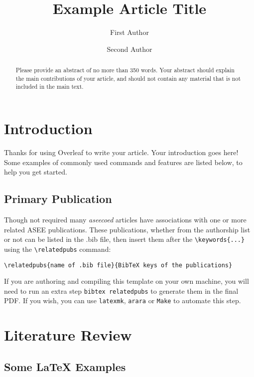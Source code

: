 \documentclass[11pt]{report}
\title{Example Article Title}
\author[1][corr.author@xyz.ac.mm]{First Author}
\author[2]{Second Author}
\affil[1]{Address of first author}
\affil[2]{Address of second author}
\begin{document}
\maketitle

\begin{abstract}
Please provide an abstract of no more than 350 words. Your abstract should explain the main contributions of your article, and should not contain any material that is not included in the main text. 
\end{abstract}



\section{Introduction}

Thanks for using Overleaf to write your article. Your introduction goes here! Some examples of commonly used commands and features are listed below, to help you get started.

\subsection{Primary Publication}

Though not required many \emph{aseecoed} articles have associations with one or more related ASEE publications. These publications, whether from the authorship list or not can be listed in the .bib file, then insert them after the \verb|\keywords{...}| using the \verb|\relatedpubs| command:

\verb|\relatedpubs{name of .bib file}{BibTeX keys of the publications}|

If you are authoring and compiling this template on your own machine, you will need to run an extra step \verb|bibtex relatedpubs| to generate them in the final PDF. If you wish, you can use \texttt{latexmk}, \texttt{arara} or \texttt{Make} to automate this step.


\section{Literature Review}



\subsection{Some \LaTeX{} Examples}
\label{sec:examples}
\end{document}
